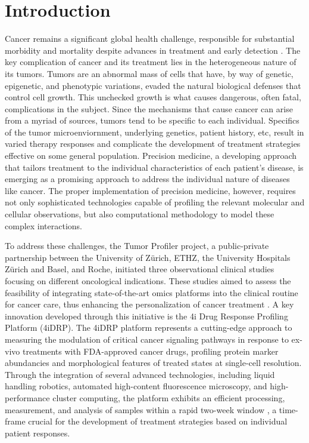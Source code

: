 \section{Introduction}
Cancer remains a significant global health challenge, responsible for substantial morbidity and mortality despite advances in treatment and early detection \cite{}.
The key complication of cancer and its treatment lies in the heterogeneous nature of its tumors.
Tumors are an abnormal mass of cells that have, by way of genetic, epigenetic, and phenotypic variations, evaded the natural biological defenses that control cell growth.
This unchecked growth is what causes dangerous, often fatal, complications in the subject.
Since the mechanisms that cause cancer can arise from a myriad of sources, tumors tend to be specific to each individual.
Specifics of the tumor microenviornment, underlying genetics, patient history, etc,
result in varied therapy responses and complicate the development of treatment strategies effective on some general population.
Precision medicine, a developing approach that tailors treatment to the individual characteristics of each patient's disease,
is emerging as a promising approach to address the individual nature of diseases like cancer.
The proper implementation of precision medicine, however, requires not only sophisticated technologies capable of profiling the relevant molecular and cellular observations,
but also computational methodology to model these complex interactions.

To address these challenges, the Tumor Profiler project, a public-private partnership between the University of Zürich, ETHZ, the University Hospitals Zürich and Basel, and Roche, initiated three observational clinical studies focusing on different oncological indications.
These studies aimed to assess the feasibility of integrating state-of-the-art omics platforms into the clinical routine for cancer care, thus enhancing the personalization of cancer treatment \cite{}.
A key innovation developed through this initiative is the 4i Drug Response Profiling Platform (4iDRP).
The 4iDRP platform represents a cutting-edge approach to measuring the modulation of critical cancer signaling pathways in response to ex-vivo treatments with FDA-approved cancer drugs,
profiling protein marker abundancies and morphological features of treated states at single-cell resolution.
Through the integration of several advanced technologies, including liquid handling robotics, automated high-content fluorescence microscopy, and high-performance cluster computing,
the platform exhibits an efficient processing, measurement, and analysis of samples within a rapid two-week window \cite{},
a time-frame crucial for the development of treatment strategies based on individual patient responses.

